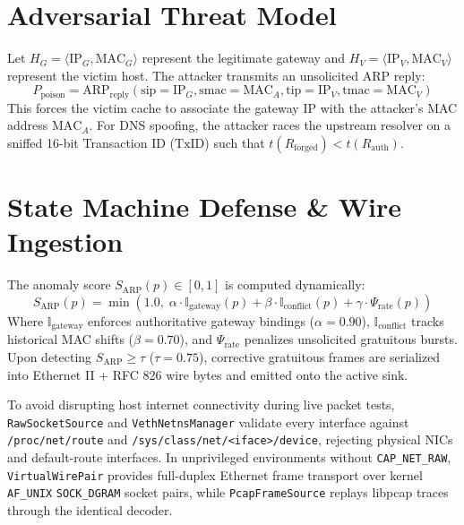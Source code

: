 \documentclass[conference]{IEEEtran}
\begin{document}
\section{Adversarial Threat Model}
Let $H_G = \langle \text{IP}_G, \text{MAC}_G \rangle$ represent the legitimate gateway and $H_V = \langle \text{IP}_V, \text{MAC}_V \rangle$ represent the victim host. The attacker transmits an unsolicited ARP reply:
\begin{equation}
P_{\text{poison}} = \text{ARP}_{\text{reply}}(\text{sip}=\text{IP}_G, \text{smac}=\text{MAC}_A, \text{tip}=\text{IP}_V, \text{tmac}=\text{MAC}_V)
\end{equation}
This forces the victim cache to associate the gateway IP with the attacker's MAC address $\text{MAC}_A$. For DNS spoofing, the attacker races the upstream resolver on a sniffed 16-bit Transaction ID ($\text{TxID}$) such that $t(R_{\text{forged}}) < t(R_{\text{auth}})$.

\section{State Machine Defense \& Wire Ingestion}
The anomaly score $S_{\text{ARP}}(p) \in [0, 1]$ is computed dynamically:
\begin{equation}
S_{\text{ARP}}(p) = \min\left(1.0,\; \alpha \cdot \mathbb{I}_{\text{gateway}}(p) + \beta \cdot \mathbb{I}_{\text{conflict}}(p) + \gamma \cdot \Psi_{\text{rate}}(p)\right)
\end{equation}
Where $\mathbb{I}_{\text{gateway}}$ enforces authoritative gateway bindings ($\alpha = 0.90$), $\mathbb{I}_{\text{conflict}}$ tracks historical MAC shifts ($\beta = 0.70$), and $\Psi_{\text{rate}}$ penalizes unsolicited gratuitous bursts. Upon detecting $S_{\text{ARP}} \ge \tau$ ($\tau = 0.75$), corrective gratuitous frames are serialized into Ethernet II + RFC 826 wire bytes and emitted onto the active sink.

To avoid disrupting host internet connectivity during live packet tests, \texttt{RawSocketSource} and \texttt{VethNetnsManager} validate every interface against \texttt{/proc/net/route} and \texttt{/sys/class/net/<iface>/device}, rejecting physical NICs and default-route interfaces. In unprivileged environments without \texttt{CAP\_NET\_RAW}, \texttt{VirtualWirePair} provides full-duplex Ethernet frame transport over kernel \texttt{AF\_UNIX} \texttt{SOCK\_DGRAM} socket pairs, while \texttt{PcapFrameSource} replays libpcap traces through the identical decoder.
\end{document}
